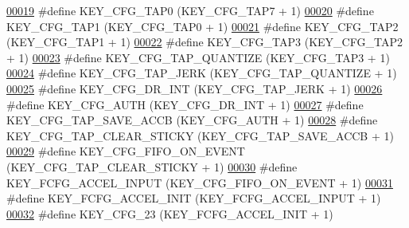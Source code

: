 \begin{DoxyCode}
\hypertarget{dmp_key_8h_source.tex_l00019}{}\hyperlink{dmp_key_8h_a2381461c31df922510a2dab0c87074dc}{00019} \textcolor{preprocessor}{#define KEY\_CFG\_TAP0                (KEY\_CFG\_TAP7 + 1)}
\hypertarget{dmp_key_8h_source.tex_l00020}{}\hyperlink{dmp_key_8h_a2a7971149e8d561f5ff6a812990114f4}{00020} \textcolor{preprocessor}{#define KEY\_CFG\_TAP1                (KEY\_CFG\_TAP0 + 1)}
\hypertarget{dmp_key_8h_source.tex_l00021}{}\hyperlink{dmp_key_8h_a0cc1a00556dd860ae3fbb84c7b90f208}{00021} \textcolor{preprocessor}{#define KEY\_CFG\_TAP2                (KEY\_CFG\_TAP1 + 1)}
\hypertarget{dmp_key_8h_source.tex_l00022}{}\hyperlink{dmp_key_8h_a9ddb8947dd125a30491d45ee528af428}{00022} \textcolor{preprocessor}{#define KEY\_CFG\_TAP3                (KEY\_CFG\_TAP2 + 1)}
\hypertarget{dmp_key_8h_source.tex_l00023}{}\hyperlink{dmp_key_8h_a42cecc6cfd04d63187c3a42fcaffd85f}{00023} \textcolor{preprocessor}{#define KEY\_CFG\_TAP\_QUANTIZE        (KEY\_CFG\_TAP3 + 1)}
\hypertarget{dmp_key_8h_source.tex_l00024}{}\hyperlink{dmp_key_8h_a1cf1ef77505274a13b6480f1aa7d9389}{00024} \textcolor{preprocessor}{#define KEY\_CFG\_TAP\_JERK            (KEY\_CFG\_TAP\_QUANTIZE + 1)}
\hypertarget{dmp_key_8h_source.tex_l00025}{}\hyperlink{dmp_key_8h_a7879a5cc9e8d48368fdf66ecb4ea7016}{00025} \textcolor{preprocessor}{#define KEY\_CFG\_DR\_INT              (KEY\_CFG\_TAP\_JERK + 1)}
\hypertarget{dmp_key_8h_source.tex_l00026}{}\hyperlink{dmp_key_8h_ab2e0eac97341ae102666b036ca7b994c}{00026} \textcolor{preprocessor}{#define KEY\_CFG\_AUTH                (KEY\_CFG\_DR\_INT + 1)}
\hypertarget{dmp_key_8h_source.tex_l00027}{}\hyperlink{dmp_key_8h_af2b9a5e5491b57fbfe64a6d979b1ff45}{00027} \textcolor{preprocessor}{#define KEY\_CFG\_TAP\_SAVE\_ACCB       (KEY\_CFG\_AUTH + 1)}
\hypertarget{dmp_key_8h_source.tex_l00028}{}\hyperlink{dmp_key_8h_ae7725cddab0831815e93942e1fbb1278}{00028} \textcolor{preprocessor}{#define KEY\_CFG\_TAP\_CLEAR\_STICKY    (KEY\_CFG\_TAP\_SAVE\_ACCB + 1)}
\hypertarget{dmp_key_8h_source.tex_l00029}{}\hyperlink{dmp_key_8h_a68a87ce723375f0bb235e9fc4356a46b}{00029} \textcolor{preprocessor}{#define KEY\_CFG\_FIFO\_ON\_EVENT       (KEY\_CFG\_TAP\_CLEAR\_STICKY + 1)}
\hypertarget{dmp_key_8h_source.tex_l00030}{}\hyperlink{dmp_key_8h_af2254874bb524938b8749e524ed845d2}{00030} \textcolor{preprocessor}{#define KEY\_FCFG\_ACCEL\_INPUT        (KEY\_CFG\_FIFO\_ON\_EVENT + 1)}
\hypertarget{dmp_key_8h_source.tex_l00031}{}\hyperlink{dmp_key_8h_a893ccb4c34573d60c12c372d8b6649a6}{00031} \textcolor{preprocessor}{#define KEY\_FCFG\_ACCEL\_INIT         (KEY\_FCFG\_ACCEL\_INPUT + 1)}
\hypertarget{dmp_key_8h_source.tex_l00032}{}\hyperlink{dmp_key_8h_a3f98e9e85d79d49c0dac77d6855d603e}{00032} \textcolor{preprocessor}{#define KEY\_CFG\_23                  (KEY\_FCFG\_ACCEL\_INIT + 1)}

\end{DoxyCode}

